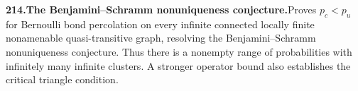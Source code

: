\documentclass[11pt,a4paper]{article}
\begin{document}
  \par \begin{minipage}{\linewidth}
  \fontsize{10.5}{12.6}\selectfont\RaggedRight
  \hypertarget{result 214}{}
  {\bfseries\textcolor{muted}{214.}\enspace The Benjamini--Schramm nonuniqueness conjecture.}\enspace Proves $p_c<p_u$ for Bernoulli bond percolation on every infinite connected locally finite nonamenable quasi-transitive graph, resolving the Benjamini--Schramm nonuniqueness conjecture. Thus there is a nonempty range of probabilities with infinitely many infinite clusters. A stronger operator bound also establishes the critical triangle condition.\par
  \end{minipage}\par\vspace{5pt}
\end{document}
